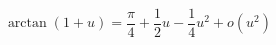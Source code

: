 \begin{displaymath}
  \arctan(1+u) = \frac{\pi}{4} + \frac{1}{2}u -\frac{1}{4}u^2 + o(u^2)
\end{displaymath}
